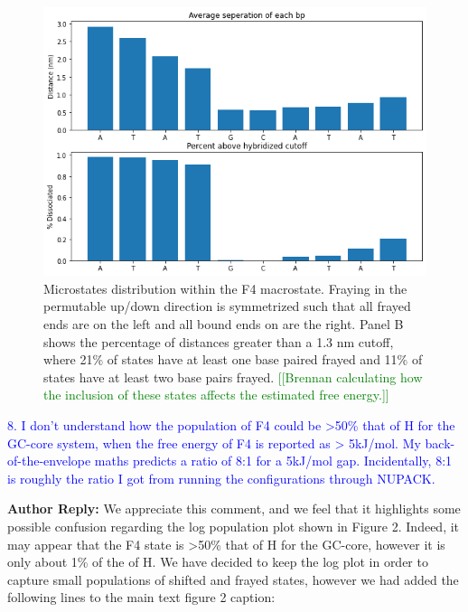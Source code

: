 \documentclass[11pt,a4paper]{letter} %
\newcommand*{\noteg}[1]{\textcolor{green}{[[#1]]}}		%
\begin{document}
\begin{figure}[ht!]
	\begin{center}
        \includegraphics[width=\textwidth]{cover_letter/revision_figures/F4_microstates.png}
        \caption{Microstates distribution within the F4 macrostate. Fraying in the permutable up/down direction is symmetrized such that all frayed ends are on the left and all bound ends on are the right. Panel B shows the percentage of distances greater than a 1.3 nm cutoff, where 21\% of states have at least one base paired frayed and 11\% of states have at least two base pairs frayed. \noteg{Brennan calculating how the inclusion of these states affects the estimated free energy.}}
        \label{fig:F4_microstates}
	\end{center}
\end{figure}

\textcolor{blue}{8. I don't understand how the population of F4 could be >50\% that of H for the GC-core system, when the free energy of F4 is reported as > 5kJ/mol. My back-of-the-envelope maths predicts a ratio of 8:1 for a 5kJ/mol gap. Incidentally, 8:1 is roughly the ratio I got from running the configurations through NUPACK.}

\textbf{Author Reply:}   We appreciate this comment, and we feel that it highlights some possible confusion regarding the log population plot shown in Figure 2. Indeed, it may appear that the F4 state is >50\% that of H for the GC-core, however it is only about 1\% of the of H. We have decided to keep the log plot in order to capture small populations of shifted and frayed states, however we had added the following lines to the main text figure 2 caption:
\end{document}
